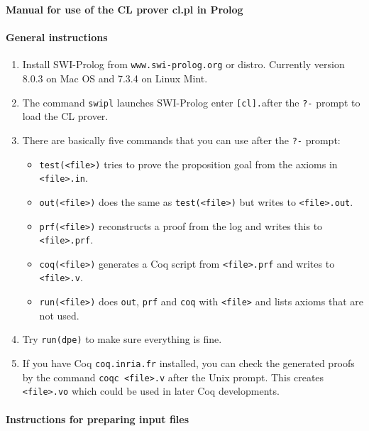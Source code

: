 \documentclass{article}
\begin{document}
\begin{center}
\textbf{Manual for use of the CL prover cl.pl in Prolog}
\end{center}

\paragraph{General instructions}

\begin{enumerate}
\item Install SWI-Prolog from \texttt{www.swi-prolog.org} or distro.
Currently version 8.0.3 on Mac OS and 7.3.4 on Linux Mint.
\item The command \texttt{swipl} launches SWI-Prolog
enter \texttt{[cl].}after the \texttt{?-} prompt to load the CL prover.
\item There are basically five commands that you can use after the
  \texttt{?-} prompt:
\begin{itemize}
\item \texttt{test(<file>)} tries to prove the proposition goal from
  the axioms in \texttt{<file>.in}.
\item \texttt{out(<file>)} does the same as \texttt{test(<file>)} but
  writes to \texttt{<file>.out}.
\item \texttt{prf(<file>)} reconstructs a proof from the log and
  writes this to \texttt{<file>.prf}.
\item \texttt{coq(<file>)} generates a Coq script from
  \texttt{<file>.prf} and writes to \texttt{<file>.v}.
\item \texttt{run(<file>)} does \texttt{out}, \texttt{prf} and
  \texttt{coq} with \texttt{<file>} and lists axioms that are not used.
\end{itemize}
\item Try \texttt{run(dpe)} to make sure everything is fine.   
\item If you have Coq \texttt{coq.inria.fr} installed, 
  you can check the generated proofs by the command \texttt{coqc <file>.v}
  after the Unix prompt. This creates \texttt{<file>.vo} which could
  be used in later Coq developments.
\end{enumerate}


\paragraph{Instructions for preparing input files}
\end{document}
